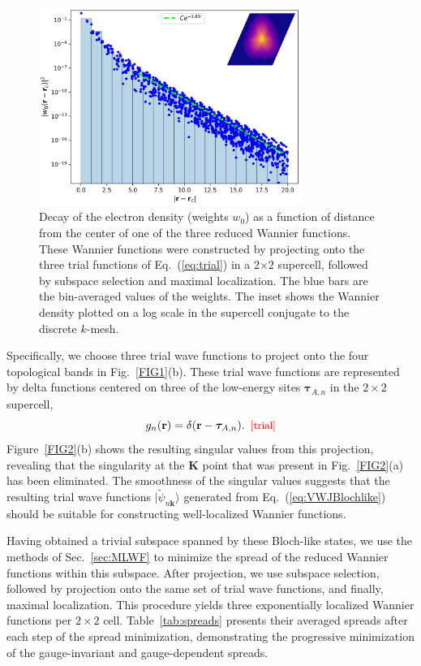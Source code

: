 \documentclass[galley,aps,pra,10pt,amsmath,amssymb,
    superscriptaddress,nofootinbib,longbibliography]{revtex4-2}
\def\Red#1{\textcolor{red}{#1}}
\newcounter{comm}
\newcommand{\eqlab}[1]{\Red{\hbox{\small\;\;[#1]}}\label{eq:#1}}
\newcommand{\eqlab}[1]{\label{eq:#1}}
\newcommand{\eq}[1]{Eq.~(\ref{eq:#1})}
\newcommand{\ket}[1]{\vert#1\rangle}
\begin{document}
\begin{figure}[b!]
\begin{center}
\includegraphics[width=3.4in]{fig3.png}
\end{center}
\vspace{-5mm}
\caption{Decay of the electron density (weights $w_0$) as a function of distance from the center of one of the three reduced Wannier functions. These Wannier functions were constructed by projecting onto the three trial functions of \eq{trial} in a 2$\times 2$ supercell, followed by subspace selection and maximal localization. The blue bars are the bin-averaged values of the weights. The inset shows the Wannier density plotted on a log scale in the supercell conjugate to the discrete $k$-mesh.}
\label{FIG3}
\end{figure}

Specifically, we choose three trial wave functions to project onto the four topological bands in Fig.~\ref{FIG1}(b). These trial wave functions are represented by delta functions centered on three of the low-energy sites $\boldsymbol{\tau}_{A,n}$ in the $2\times2$ supercell,
\begin{equation}
     g_n(\mathbf{r}) = \delta(\mathbf{r} - \boldsymbol{\tau}_{A,n}).
     \eqlab{trial}
\end{equation}
Figure~\ref{FIG2}(b) shows the resulting singular values from this projection, revealing that the singularity at the $\mathbf{K}$ point that was present in Fig.~\ref{FIG2}(a) has been eliminated. The smoothness of the singular values suggests that the resulting trial wave functions $\ket{\tilde{\psi}_{n\mathbf{k}}}$ generated from \eq{VWJBlochlike} should be suitable for constructing well-localized Wannier functions.

Having obtained a trivial subspace spanned by these Bloch-like states, we use the methods of Sec.~\ref{sec:MLWF} to minimize the spread of the reduced Wannier functions within this subspace. After projection, we use subspace selection, followed by projection onto the same set of trial wave functions, and finally, maximal localization. This procedure yields three exponentially localized Wannier functions per $2\times2$ cell. Table~\ref{tab:spreads} presents their averaged spreads after each step of the spread minimization, demonstrating the progressive minimization of the gauge-invariant and gauge-dependent spreads. 
\end{document}
